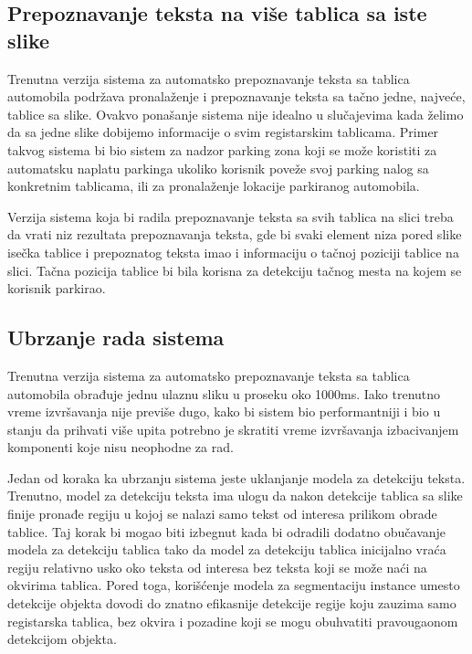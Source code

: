 \documentclass[a4paper,12pt]{article}
\begin{document}
	\subsection{Prepoznavanje teksta na više tablica sa iste slike}
	
	Trenutna verzija sistema za automatsko prepoznavanje teksta sa tablica automobila podržava pronalaženje i prepoznavanje teksta sa tačno jedne, najveće, tablice sa slike. Ovakvo ponašanje sistema nije idealno u slučajevima kada želimo da sa jedne slike dobijemo informacije o svim registarskim tablicama. Primer takvog sistema bi bio sistem za nadzor parking zona koji se može koristiti za automatsku naplatu parkinga ukoliko korisnik poveže svoj parking nalog sa konkretnim tablicama, ili za pronalaženje lokacije parkiranog automobila.
	
	Verzija sistema koja bi radila prepoznavanje teksta sa svih tablica na slici treba da vrati niz rezultata prepoznavanja teksta, gde bi svaki element niza pored slike isečka tablice i prepoznatog teksta imao i informaciju o tačnoj poziciji tablice na slici. Tačna pozicija tablice bi bila korisna za detekciju tačnog mesta na kojem se korisnik parkirao.
	
	\subsection{Ubrzanje rada sistema}
	
	Trenutna verzija sistema za automatsko prepoznavanje teksta sa tablica automobila obrađuje jednu ulaznu sliku u proseku oko 1000ms. Iako trenutno vreme izvršavanja nije previše dugo, kako bi sistem bio performantniji i bio u stanju da prihvati više upita potrebno je skratiti vreme izvršavanja izbacivanjem komponenti koje nisu neophodne za rad.
	
	Jedan od koraka ka ubrzanju sistema jeste uklanjanje modela za detekciju teksta. Trenutno, model za detekciju teksta ima ulogu da nakon detekcije tablica sa slike finije pronađe regiju u kojoj se nalazi samo tekst od interesa prilikom obrade tablice. Taj korak bi mogao biti izbegnut kada bi odradili dodatno obučavanje modela za detekciju tablica tako da model za detekciju tablica inicijalno vraća regiju relativno usko oko teksta od interesa bez teksta koji se može naći na okvirima tablica. Pored toga, korišćenje modela za segmentaciju instance umesto detekcije objekta dovodi do znatno efikasnije detekcije regije koju zauzima samo registarska tablica, bez okvira i pozadine koji se mogu obuhvatiti pravougaonom detekcijom objekta.
	
\end{document}

